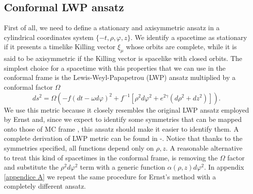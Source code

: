 \subsection{Conformal LWP ansatz}
First of all, we need to define a stationary and axisymmetric ansatz in a cylindrical coordinates system $\{-t,\rho,\varphi,z\}$.
We identify a spacetime as stationary if it presents a timelike Killing vector $\xi_{\mu}$ whose orbits are complete, while it is said to be axisymmetric if the Killing vector is spacelike with closed orbits. The simplest choice for a spacetime with this properties that we can use in the conformal frame is the Lewis-Weyl-Papapetrou (LWP) ansatz multiplied by a conformal factor $\Omega$
\begin{equation}
        ds^2 = \Omega\left(-f(dt - \omega d\varphi)^2 + f^{-1}\left[ \rho^2 d\varphi^2 + e^{2\gamma}(d\rho^2+dz^2)\right] \right).
        \label{ansatz_wlp}
\end{equation}
We use this metric because it closely resembles the original LWP ansatz employed by Ernst and, since we expect to identify some symmetries that can be mapped onto those of MC frame \citep{embedding}, this ansatz should make it easier to identify them. A complete derivation of LWP metric can be found in \citep{Illy}-\citep{Martelli}. Notice that thanks to the symmetries specified, all functions depend only on $\rho, z$. A reasonable alternative to treat this kind of spacetimes in the conformal frame, is removing the $\Omega$ factor and substitute the $\rho^2 d\varphi^2$ term with a generic function $\alpha(\rho, z)d\varphi^2$. In appendix \ref{appendice A} we repeat the same procedure for Ernst's method with a completely different ansatz.

